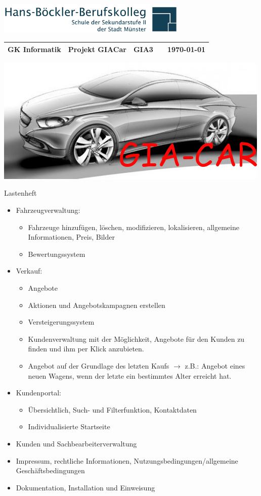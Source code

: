 \documentclass[12pt,a4paper]{letter}
\begin{document}
\raggedleft\includegraphics[height=1.5cm]{images/hbbk-logo.png}
\\
\begin{tabular}{p{4cm} p{5cm} p{1.5cm} p{1.5cm} p{3cm}}
  \tabularnewline
  \textbf{GK Informatik} & \textbf{Projekt GIACar}    & GIA3    &  & {\today} \tabularnewline 
  \hline
\end{tabular}





\centering
\includegraphics[width=0.7\linewidth]{./images/GIAcar}


\centering\Huge{Lastenheft} \\


\normalsize
\begin{itemize}

\item Fahrzeugverwaltung:
\begin{itemize}
\item Fahrzeuge hinzufügen, löschen, modifizieren, lokalisieren, allgemeine Informationen, Preis, Bilder
\item Bewertungssystem
\end{itemize}
\item Verkauf: 
\begin{itemize}
\item Angebote
\item Aktionen und Angebotskampagnen  erstellen
\item Versteigerungssystem
\item Kundenverwaltung mit der Möglichkeit, Angebote für den Kunden zu finden und ihm per Klick anzubieten.
\item Angebot auf der Grundlage des letzten Kaufs $\rightarrow$ z.B.: Angebot eines neuen Wagens, wenn der letzte ein bestimmtes Alter erreicht hat.
\end{itemize}
\item Kundenportal: 
\begin{itemize}
\item Übersichtlich, Such- und Filterfunktion, Kontaktdaten
\item Individualisierte Startseite

\end{itemize}
\item Kunden und Sachbearbeiterverwaltung
\item Impressum, rechtliche Informationen, Nutzungsbedingungen/allgemeine Geschäftsbedingungen
\item Dokumentation, Installation und Einweisung

\end{itemize}
\end{document}
